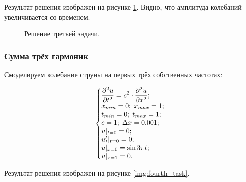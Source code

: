\documentclass[12pt,a4paper,russian]{report}
\begin{document}
	Результат решения изображен на рисунке \ref{img:third_task}. Видно, что амплитуда колебаний увеличивается со временем.
	
	\begin{figure}[h]
		\caption{Решение третьей задачи.}
		\label{img:third_task}
	\end{figure}
	
	\newpage
	\subsubsection{Сумма трёх гармоник}
	
	Смоделируем колебание струны на первых трёх собственных частотах:
	
	\begin{equation*}
		\left\{\begin{array}{@{}l@{}}
			\displaystyle \frac{\partial^2u}{\partial t^2} = c^2 \cdot \frac{\partial^2u}{\partial x^2}; \\
			x_{min} = 0; \; x_{max} = 1; \\
			t_{min} = 0; \; t_{max} = 1; \\
			c = 1; \;  \Delta x = 0.001; \\
			u|_{t=0} = 0; \\
			u'_{t}|_{t=0} = 0; \\
			u|_{x=0} = \sin 3 \pi t; \\
			u|_{x=1} = 0.
		\end{array}\right.\,
	\end{equation*}
	
	Результат решения изображен на рисунке \ref{img:fourth_task}.
	
\end{document}
